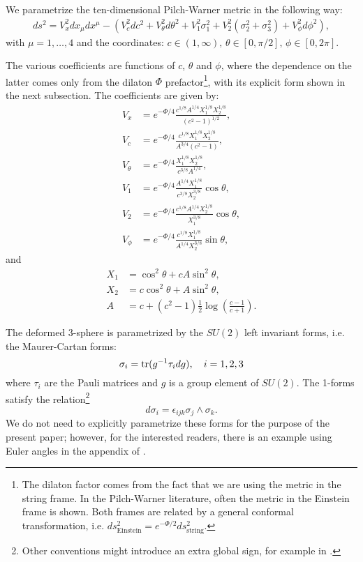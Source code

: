 We parametrize the ten-dimensional Pilch-Warner metric in the following way:
\begin{align}\label{eq:PWmetric}
ds^2 =
V_x^2 dx_\mu dx^\mu -\left(
V_c^2 dc^2 + V_\theta^2 d\theta^2 + V_1^2 \sigma_1^2 + V_2^2 (\sigma_2^2 + \sigma_3^2) + V_\phi^2 d\phi^2\right),
\end{align}
with $\mu=1,\ldots,4$ and the coordinates: $c\in(1, \infty), \, \theta \in [0, \pi/2], \, \phi \in [0, 2\pi]$. 

The various coefficients are functions of $c$, $\theta$ and $\phi$, where the dependence on the latter comes only from the dilaton $\Phi$ prefactor\footnote{The dilaton factor comes from the fact that we are using the metric in the string frame. In the Pilch-Warner literature, often the metric in the Einstein frame is shown. Both frames are related by a general conformal transformation, i.e. $ds^2_\text{Einstein} = e^{-\Phi / 2} ds^2_\text{string}$.}, with its explicit form shown in the next subsection. 
The coefficients are given by:
\begin{align}\label{eq:PWvielbeins}
V_x &=e^{-\Phi/4} \frac{c^{1/8} A^{1/4} X_1^{1/8} X_2^{1/8}}{(c^2 - 1)^{1/2}},\nonumber\\
V_c &= e^{-\Phi/4}\frac{c^{1/8}X_1^{1/8} X_2^{1/8}}{A^{3/4} (c^2-1)},\nonumber\\
V_\theta &= e^{-\Phi/4}\frac{X_1^{1/8} X_2^{1/8}}{c^{3/8}A^{1/4}},\nonumber\\
V_1 &= e^{-\Phi/4}\frac{A^{1/4}X_1^{1/8} }{c^{3/8}X_2^{3/8}} \cos\theta,\nonumber\\
V_2 &= e^{-\Phi/4}\frac{c^{1/8}A^{1/4}X_2^{1/8} }{X_1^{3/8}} \cos\theta, \nonumber\\
V_\phi &= e^{-\Phi/4}\frac{c^{1/8}X_1^{1/8} }{A^{1/4}X_2^{3/8}} \sin\theta,
\end{align}
and
\begin{align}
X_1 &=  \cos^2\theta + cA  \sin^2\theta,\nonumber\\
X_2 &= c \cos^2\theta + A  \sin^2\theta, \nonumber\\
A &= c+(c^2 -1)\frac{1}{2}\log\left(\frac{c-1}{c+1}\right).
\end{align}

The deformed 3-sphere is parametrized by the $SU(2)$ left invariant forms, i.e. the Maurer-Cartan forms:
\begin{equation}
\sigma_i = \mathop{\mathrm{tr}}(g^{-1}\tau_i d g), \quad i = 1,2,3
\end{equation}
where $\tau_i$ are the Pauli matrices and $g$ is a group element of $SU(2)$. The 1-forms satisfy the relation\footnote{Other conventions might introduce an extra global sign, for example in \cite{Buchel:2000cn}.}
\begin{equation}
 d\sigma_i  = \epsilon_{i j k} \sigma_j \wedge \sigma_k.
\end{equation}
We do not need to explicitly parametrize these forms for the purpose of the present paper; however, for the interested readers, there is an example using Euler angles in the appendix of \cite{Chen-Lin:2015xlh}. 


